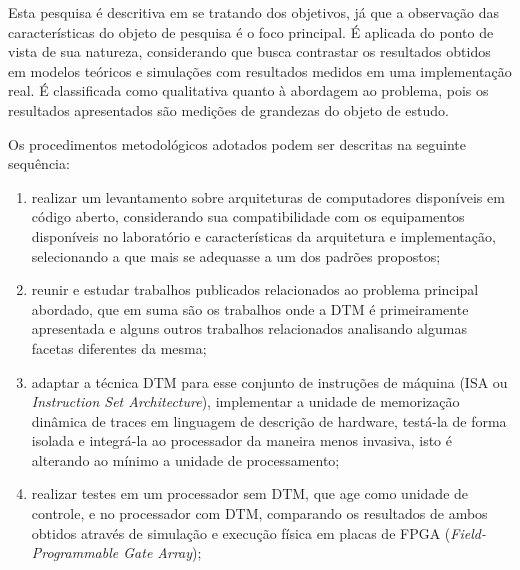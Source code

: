 \label{Metodologia}



Esta pesquisa é descritiva em se tratando dos objetivos, já que a observação das características do objeto de pesquisa é o foco principal. É aplicada do ponto de vista de sua natureza, considerando que busca contrastar os resultados obtidos em modelos teóricos e simulações com resultados medidos em uma implementação real. É classificada como qualitativa quanto à abordagem ao problema, pois os resultados apresentados são medições de grandezas do objeto de estudo.

Os procedimentos metodológicos adotados podem ser descritas na seguinte sequência:

\begin{enumerate}

\item realizar um levantamento sobre arquiteturas de computadores disponíveis em código aberto, considerando sua compatibilidade com os equipamentos disponíveis no laboratório e características da arquitetura e implementação, selecionando a que mais se adequasse a um dos padrões propostos;


\item reunir e estudar trabalhos publicados relacionados ao problema principal abordado, que em suma são os trabalhos onde a DTM é primeiramente apresentada e alguns outros trabalhos relacionados analisando algumas facetas diferentes da mesma;


\item adaptar a técnica DTM para esse conjunto de instruções de máquina (ISA ou \textit{Instruction Set Architecture}), implementar a unidade de memorização dinâmica de traces em linguagem de descrição de hardware, testá-la de forma isolada e integrá-la ao processador da maneira menos invasiva, isto é alterando ao mínimo a unidade de processamento; 

\item realizar testes em um processador sem DTM, que age como unidade de controle, e no processador com DTM, comparando os resultados de ambos obtidos através de  simulação e execução física em placas de FPGA (\textit{Field-Programmable Gate Array});

\end{enumerate}

